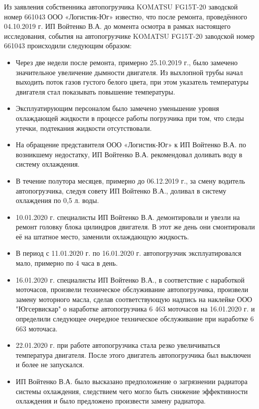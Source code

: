 Из заявления  собственника автопогрузчика KOMATSU FG15T-20 заводской номер 661043 ООО «Логистик-Юг» известно, что после ремонта, проведённого 04.10.2019 г. ИП Войтенко В.А. до момента  осмотра в рамках настоящего исследования, события на автопогрузчике KOMATSU FG15T-20 заводской номер 661043 происходили следующим образом:
\begin{itemize}
\item  
Через две недели после ремонта, примерно 25.10.2019 г., было замечено значительное увеличение дымности двигателя. Из выхлопной трубы начал выходить поток газов густого  белого цвета, при этом указатель температуры двигателя стал показывать повышение температуры. 
\item 
Эксплуатирующим персоналом было замечено уменьшение уровня охлаждающей жидкости в процессе работы погрузчика при том, что следы утечки, подтекания жидкости отсутствовали.
\item  
На обращение представителя ООО «Логистик-Юг» к ИП Войтенко В.А. по возникшему недостатку,  ИП Войтенко В.А. рекомендовал доливать воду в систему охлаждения. 
\item 	
В течение полутора месяцев, примерно до 06.12.2019 г., за смену водитель автопогрузчика, следуя совету ИП Войтенко В.А., доливал в систему охлаждения по 0,5 л. воды.
\item 	
10.01.2020 г. специалисты ИП Войтенко В.А.  демонтировали и увезли на ремонт головку блока цилиндров двигателя. В этот же день они смонтировали её на штатное место, заменили охлаждающую жидкость.
\item 	
В период с 11.01.2020 г. по 16.01.2020 г. автопогрузчик эксплуатировался мало, примерно по 4 часа в день.
\item 	
16.01.2020 г. специалисты ИП Войтенко В.А., в соответствие с наработкой моточасов, произвели техническое обслуживание автопогрузчика, произвели замену моторного масла, сделав соответствующую надпись на наклейке ООО "Югсервискар" о наработке автопогрузчика 6 463 моточасов на 16.01.2020 г. и определили  следующее очередное техническое обслуживание  при наработке 6 663 моточаса.
\item 	
22.01.2020 г. при работе автопогрузчика стала резко увеличиваться температура двигателя. После этого двигатель автопогрузчика был выключен и более не запускался.
\item  
ИП Войтенко В.А. было высказано предположение о загрязнении радиатора системы охлаждения, следствием чего могло быть снижение эффективности охлаждения и было предложено произвести замену радиатора. 
\end{itemize}


